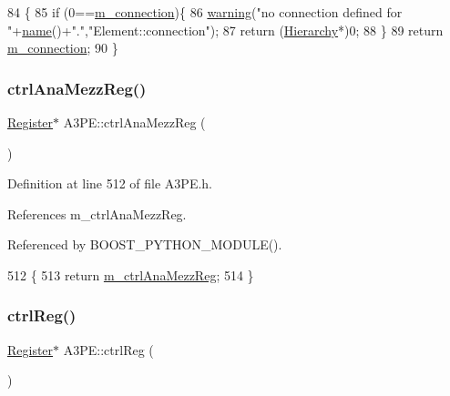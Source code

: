 \begin{DoxyCode}
84                               \{
85   \textcolor{keywordflow}{if} (0==\hyperlink{classElement_abe3de7a5dbbc9a6dd2d7e012e5fdb266}{m\_connection})\{
86     \hyperlink{classObject_a65cd4fda577711660821fd2cd5a3b4c9}{warning}(\textcolor{stringliteral}{"no connection defined for "}+\hyperlink{classObject_a300f4c05dd468c7bb8b3c968868443c1}{name}()+\textcolor{stringliteral}{"."},\textcolor{stringliteral}{"Element::connection"});
87     \textcolor{keywordflow}{return} (\hyperlink{classHierarchy}{Hierarchy}*)0;
88   \}
89   \textcolor{keywordflow}{return} \hyperlink{classElement_abe3de7a5dbbc9a6dd2d7e012e5fdb266}{m\_connection};
90 \}
\end{DoxyCode}
\mbox{\label{classA3PE_aa94c6120a73194d69dc5761cf90a4800}} 
\subsubsection{\texorpdfstring{ctrl\+Ana\+Mezz\+Reg()}{ctrlAnaMezzReg()}}
{\footnotesize\ttfamily \hyperlink{classRegister}{Register}$\ast$ A3\+P\+E\+::ctrl\+Ana\+Mezz\+Reg (\begin{DoxyParamCaption}{ }\end{DoxyParamCaption})\hspace{0.3cm}{\ttfamily [inline]}}



Definition at line 512 of file A3\+P\+E.\+h.



References m\+\_\+ctrl\+Ana\+Mezz\+Reg.



Referenced by B\+O\+O\+S\+T\+\_\+\+P\+Y\+T\+H\+O\+N\+\_\+\+M\+O\+D\+U\+L\+E().


\begin{DoxyCode}
512                             \{
513     \textcolor{keywordflow}{return} \hyperlink{classA3PE_a126a936a5fd4fd4b83485b3637e1fa84}{m\_ctrlAnaMezzReg};
514   \}
\end{DoxyCode}
\mbox{\label{classA3PE_ae5fc5dac92af2b34a41be388586647be}} 
\subsubsection{\texorpdfstring{ctrl\+Reg()}{ctrlReg()}}
{\footnotesize\ttfamily \hyperlink{classRegister}{Register}$\ast$ A3\+P\+E\+::ctrl\+Reg (\begin{DoxyParamCaption}{ }\end{DoxyParamCaption})\hspace{0.3cm}{\ttfamily [inline]}}



